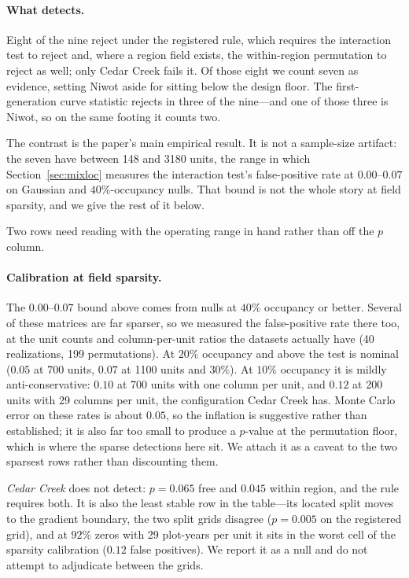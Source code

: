 \documentclass[review,12pt,authoryear]{elsarticle}
\theoremstyle{remark}
\begin{document}


\paragraph{What detects.} Eight of the nine reject under the registered
rule, which requires the interaction test to reject and, where a region
field exists, the within-region permutation to reject as well; only Cedar
Creek fails it. Of those eight we count seven as evidence, setting Niwot
aside for sitting below the design floor. The first-generation curve
statistic rejects in three of the nine---and one of those three is Niwot,
so on the same footing it counts two.

The contrast is the paper's main empirical result. It is not a sample-size
artifact: the seven have between 148 and 3180 units, the range in which
Section~\ref{sec:mixloc} measures the interaction test's false-positive rate
at $0.00$--$0.07$ on Gaussian and $40\%$-occupancy nulls. That bound is not
the whole story at field sparsity, and we give the rest of it below.

Two rows need reading with the operating range in hand rather than off the
$p$ column.

\paragraph{Calibration at field sparsity.} The $0.00$--$0.07$ bound above
comes from nulls at $40\%$ occupancy or better. Several of these matrices
are far sparser, so we measured the false-positive rate there too, at the
unit counts and column-per-unit ratios the datasets actually have (40
realizations, 199 permutations). At $20\%$ occupancy and above the test is
nominal ($0.05$ at 700 units, $0.07$ at 1100 units and $30\%$). At $10\%$
occupancy it is mildly anti-conservative: $0.10$ at 700 units with one
column per unit, and $0.12$ at 200 units with 29 columns per unit, the
configuration Cedar Creek has. Monte Carlo error on these rates is about
$0.05$, so the inflation is suggestive rather than established; it is also
far too small to produce a $p$-value at the permutation floor, which is
where the sparse detections here sit. We attach it as a caveat to the two
sparsest rows rather than discounting them.

\emph{Cedar Creek} does not detect: $p = 0.065$ free and $0.045$ within
region, and the rule requires both. It is also the least stable row in the
table---its located split moves to the gradient boundary, the two split
grids disagree ($p = 0.005$ on the registered grid), and at $92\%$ zeros
with 29 plot-years per unit it sits in the worst cell of the sparsity
calibration ($0.12$ false positives). We report it as a null and do not
attempt to adjudicate between the grids.
\end{document}
